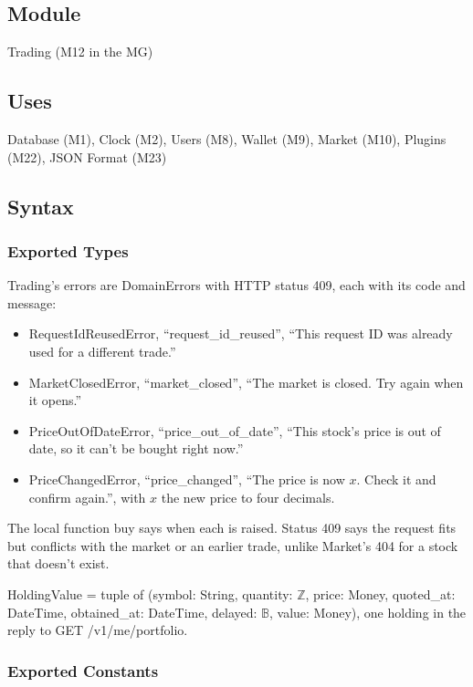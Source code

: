 \documentclass[12pt, titlepage]{article}
\begin{document}
\subsection{Module}

Trading (M12 in the MG)

\subsection{Uses}

Database (M1), Clock (M2), Users (M8), Wallet (M9), Market (M10), Plugins
(M22), JSON Format (M23)

\subsection{Syntax}

\subsubsection{Exported Types}

{\raggedright\noindent Trading's errors are DomainErrors with HTTP status
409, each with its code and message:
\begin{itemize}
\item RequestIdReusedError, ``request\_id\_reused'', ``This request ID was
  already used for a different trade.''
\item MarketClosedError, ``market\_closed'', ``The market is closed. Try again
  when it opens.''
\item PriceOutOfDateError, ``price\_out\_of\_date'', ``This stock's price is
  out of date, so it can't be bought right now.''
\item PriceChangedError, ``price\_changed'', ``The price is now $x$. Check it
  and confirm again.'', with $x$ the new price to four decimals.
\end{itemize}
The local function buy says when each is raised. Status 409 says the request fits but conflicts with the market or an
earlier trade, unlike Market's 404 for a stock that doesn't exist.\par}

\medskip
\noindent HoldingValue = tuple of (symbol: String, quantity: $\mathbb{Z}$,
price: Money, quoted\_at: DateTime, obtained\_at: DateTime, delayed: $\mathbb{B}$,
value: Money), one holding in the reply to GET /v1/me/portfolio.

\subsubsection{Exported Constants}
\end{document}
